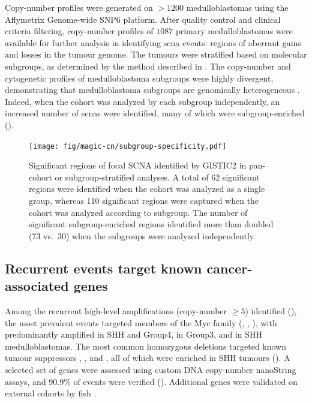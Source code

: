 Copy-number profiles were generated on $> 1200$ medulloblastomas using the Affymetrix Genome-wide SNP6 platform. After quality control and clinical criteria filtering, copy-number profiles of $1087$ primary medulloblastomas were available for further analysis in identifying \gls{scna} events: regions of aberrant gains and losses in the tumour genome. The tumours were stratified based on molecular subgroups, as determined by the method described in . The copy-number and cytogenetic profiles of medulloblastoma subgroups were highly divergent, demonstrating that medulloblastoma subgroups are genomically heterogeneous . Indeed, when the cohort was analyzed by each subgroup independently, an increased number of \gls{scnas} were identified, many of which were subgroup-enriched ().

\begin{figure}
	\centering
	\texttt{[image: fig/magic-cn/subgroup-specificity.pdf]}
	\caption[Significant regions of focal SCNA identified by GISTIC2]
	{
	Significant regions of focal SCNA identified by GISTIC2 in pan-cohort or subgroup-stratified analyses.
	A total of 62 significant regions were identified when the cohort was analyzed as a single group, whereas 110 significant regions were captured when the cohort was analyzed according to subgroup. The number of significant subgroup-enriched regions identified more than doubled (73 vs.\ 30) when the subgroups were analyzed independently.
	}
	\label{fig:subgroup-specificity}
\end{figure}

\subsection{Recurrent events target known cancer-associated genes}

Among the recurrent high-level amplifications (copy-number $\geq 5$) identified (), the most prevalent events targeted members of the Myc family (, , ), with  predominantly amplified in SHH and Group4,  in Group3, and  in SHH medulloblastomas. The most common homozygous deletions targeted known tumour suppressors , , and , all of which were enriched in SHH tumours (). A selected set of genes were assessed using custom DNA copy-number nanoString assays, and 90.9\% of events were verified (). Additional genes were validated on external cohorts by \gls{fish} .

